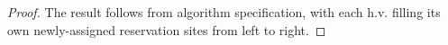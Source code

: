 \begin{proof}
The result follows from algorithm specification, with each h.v. filling its own newly-assigned reservation sites from left to right.
\end{proof}
